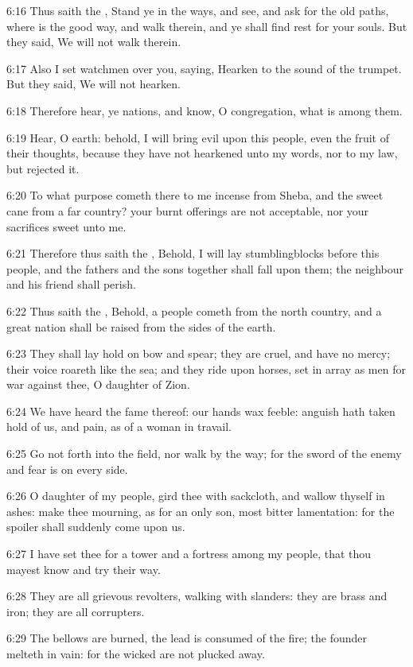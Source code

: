 6:16 Thus saith the \LORD, Stand ye in the ways, and see, and ask for the old paths, where is the good way, and walk therein, and ye shall find rest for your souls. But they said, We will not walk therein.

6:17 Also I set watchmen over you, saying, Hearken to the sound of the trumpet. But they said, We will not hearken.

6:18 Therefore hear, ye nations, and know, O congregation, what is among them.

6:19 Hear, O earth: behold, I will bring evil upon this people, even the fruit of their thoughts, because they have not hearkened unto my words, nor to my law, but rejected it.

6:20 To what purpose cometh there to me incense from Sheba, and the sweet cane from a far country? your burnt offerings are not acceptable, nor your sacrifices sweet unto me.

6:21 Therefore thus saith the \LORD, Behold, I will lay stumblingblocks before this people, and the fathers and the sons together shall fall upon them; the neighbour and his friend shall perish.

6:22 Thus saith the \LORD, Behold, a people cometh from the north country, and a great nation shall be raised from the sides of the earth.

6:23 They shall lay hold on bow and spear; they are cruel, and have no mercy; their voice roareth like the sea; and they ride upon horses, set in array as men for war against thee, O daughter of Zion.

6:24 We have heard the fame thereof: our hands wax feeble: anguish hath taken hold of us, and pain, as of a woman in travail.

6:25 Go not forth into the field, nor walk by the way; for the sword of the enemy and fear is on every side.

6:26 O daughter of my people, gird thee with sackcloth, and wallow thyself in ashes: make thee mourning, as for an only son, most bitter lamentation: for the spoiler shall suddenly come upon us.

6:27 I have set thee for a tower and a fortress among my people, that thou mayest know and try their way.

6:28 They are all grievous revolters, walking with slanders: they are brass and iron; they are all corrupters.

6:29 The bellows are burned, the lead is consumed of the fire; the founder melteth in vain: for the wicked are not plucked away.

